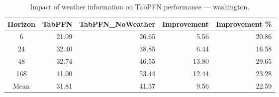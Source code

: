 \begin{table}
\centering
\caption{Impact of weather information on TabPFN performance — washington.}
\label{tab:tabpfn_weather_washington}
\begin{tabular}{crrrr}
\toprule
Horizon & TabPFN & TabPFN\_NoWeather & Improvement & Improvement \% \\
\midrule
6 & 21.09 & 26.65 & 5.56 & 20.86 \\
24 & 32.40 & 38.85 & 6.44 & 16.58 \\
48 & 32.74 & 46.55 & 13.80 & 29.65 \\
168 & 41.00 & 53.44 & 12.44 & 23.28 \\
\midrule
Mean & 31.81 & 41.37 & 9.56 & 22.59 \\
\bottomrule
\end{tabular}
\end{table}
